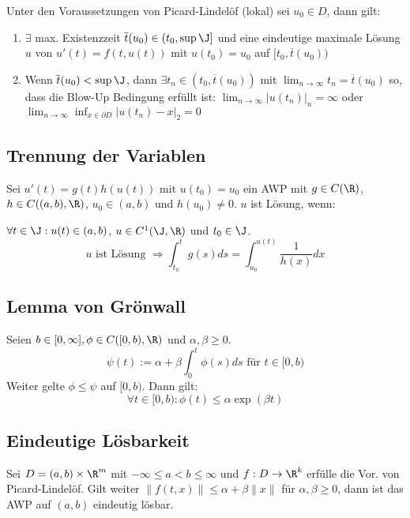 Unter den Voraussetzungen von Picard-Lindelöf (lokal) sei \(u_0 \in D\), dann gilt:

\begin{enumerate}[label=(\alph*)]
	\item \(\exists\) max. Existenzzeit \(\overline t(u_0) \in (t_0, \sup \J]\) und eine eindeutige maximale Lösung \(u\) von \(u'(t) = f(t, u(t))\) mit \(u(t_0) = u_0\) auf \([t_0, \overline t(u_0))\)
	\item Wenn \(\overline t(u_0) < \sup \J\), dann \(\exists t_n \in (t_0, \overline t(u_0))\) mit \(\lim_{n \to \infty} t_n = \overline t(u_0)\) so, dass die Blow-Up Bedingung erfüllt ist: \(\lim_{n \to \infty} |u(t_n)|_n = \infty\) oder \(\lim_{n \to \infty} \inf_{x \in \partial D} |u(t_n) - x|_2 = 0\)
\end{enumerate}

\subsection*{Trennung der Variablen}

Sei \(u'(t)=g(t)h(u(t))\) mit \(u(t_0)=u_0\) ein AWP mit \(g \in C(\R)\), \(h \in C((a, b), \R)\), \(u_0 \in (a, b)\) und \(h(u_0) \neq 0\). \(u\) ist Lösung, wenn:

\(\forall t \in \J : u(t) \in (a, b)\), \(u \in C^1(\J, \R)\) und \(t_0 \in \J\).
\[ u \text{ ist Lösung } \Rightarrow \int_{t_0}^t g(s) ds = \int_{u_0}^{u(t)} \frac{1}{h(x)} dx \]

\subsection*{Lemma von Grönwall}

Seien \(b \in [0,\infty], \phi \in C([0,b),\R)\) und \(\alpha, \beta \geq 0\).
\[\psi(t) := \alpha + \beta \int_0^t \phi(s) ds \text{ für } t \in [0,b)\]
Weiter gelte \(\phi \leq \psi\) auf \([0,b)\). Dann gilt:
\[\forall t \in [0,b) : \phi(t) \leq \alpha \exp(\beta t)\]

\subsection*{Eindeutige Lösbarkeit}

Sei \(D = (a,b) \times \R^m\) mit \(-\infty \leq a < b \leq \infty\) und \(f : D \to \R^k\) erfülle die Vor. von Picard-Lindelöf. Gilt weiter \(\|f(t,x)\| \leq \alpha + \beta \|x\|\) für \(\alpha, \beta \geq 0\), dann ist das AWP auf \((a,b)\) eindeutig lösbar.

